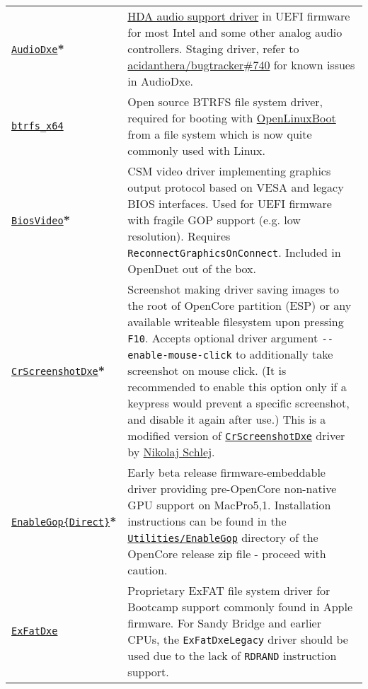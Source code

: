 \documentclass[]{article}
\begin{document}
\begin{longtable}{p{1.65in}p{5.25in}}
\href{https://github.com/acidanthera/OpenCorePkg}{\texttt{AudioDxe}}\textbf{*}
& \hyperref[uefiaudio]{HDA audio support driver} in UEFI firmware for most Intel and some other analog audio controllers.
  Staging driver, refer to \href{https://github.com/acidanthera/bugtracker/issues/740}{acidanthera/bugtracker\#740}
  for known issues in AudioDxe. \\
\href{https://github.com/acidanthera/OcBinaryData}{\texttt{btrfs\_x64}}
& Open source BTRFS file system driver, required for booting with \hyperref[uefilinux]{OpenLinuxBoot}
  from a file system which is now quite commonly used with Linux. \\
\href{https://github.com/acidanthera/OpenCorePkg}{\texttt{BiosVideo}}\textbf{*}
& CSM video driver implementing graphics output protocol based on VESA and legacy
  BIOS interfaces. Used for UEFI firmware with fragile GOP support (e.g. low resolution).
  Requires \texttt{ReconnectGraphicsOnConnect}. Included in OpenDuet out of the box. \\
\href{https://github.com/acidanthera/OpenCorePkg}{\texttt{CrScreenshotDxe}}\textbf{*}
& Screenshot making driver saving images to the root of OpenCore partition (ESP) or
  any available writeable filesystem upon pressing \texttt{F10}.
  Accepts optional driver argument \texttt{-{}-enable-mouse-click} to additionally take
  screenshot on mouse click. (It is recommended to enable this option only if a keypress
  would prevent a specific screenshot, and disable it again after use.)
  This is a modified version of \href{https://github.com/LongSoft/CrScreenshotDxe}{\texttt{CrScreenshotDxe}}
  driver by \href{https://github.com/NikolajSchlej}{Nikolaj Schlej}. \\
\href{https://github.com/acidanthera/OpenCorePkg}{\texttt{EnableGop\{Direct\}}}\textbf{*}
& Early beta release firmware-embeddable driver providing pre-OpenCore non-native GPU support
  on MacPro5,1. Installation instructions can be found in the
  \href{https://github.com/acidanthera/OpenCorePkg/blob/master/Staging/EnableGop/README.md}{\texttt{Utilities/EnableGop}}
  directory of the OpenCore release zip file - proceed with caution. \\
\href{https://github.com/acidanthera/OcBinaryData}{\texttt{ExFatDxe}}
& Proprietary ExFAT file system driver for Bootcamp support commonly found in Apple
  firmware. For Sandy Bridge and earlier CPUs, the \texttt{ExFatDxeLegacy} driver should be
  used due to the lack of \texttt{RDRAND} instruction support. \\

\end{longtable}
\end{document}
